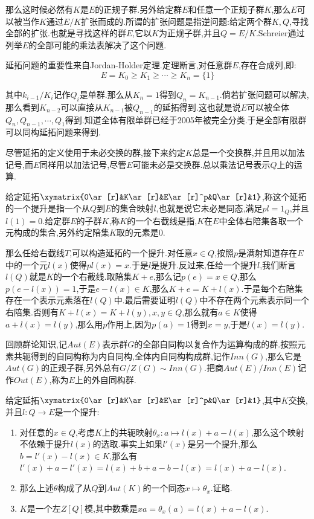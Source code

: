 那么这时候必然有$K$是$E$的正规子群.另外给定群$E$和任意一个正规子群$K$,那么$E$可以被当作$K$通过$E/K$扩张而成的.所谓的扩张问题是指逆问题:给定两个群$K,Q$,寻找全部的扩张.也就是寻找这样的群$E$,它以$K$为正规子群,并且$Q=E/K$.Schreier通过列举$E$的全部可能的乘法表解决了这个问题.

延拓问题的重要性来自Jordan-Holder定理.定理断言,对任意群$E$,存在合成列,即:
$$E=K_0\ge K_1\ge\cdots\ge K_n=\{1\}$$

其中$k_{i-1}/K_i$记作$Q_i$是单群.那么从$K_n=1$得到$Q_{n}=K_{n-1}$.倘若扩张问题可以解决,那么看到$K_{n-2}$可以直接从$K_{n-1}$被$Q_{n-1}$的延拓得到.这也就是说$E$可以被全体$Q_n,Q_{n-1},\cdots,Q_1$得到.知道全体有限单群已经于2005年被完全分类.于是全部有限群可以同构延拓问题来得到.

尽管延拓的定义使用于未必交换的群,接下来约定$K$总是一个交换群,并且用以加法记号,而$E$同样用以加法记号,尽管$E$可能未必是交换群.总以乘法记号表示$Q$上的运算.

给定延拓$\xymatrix{0\ar[r]&K\ar[r]&E\ar[r]^p&Q\ar[r]&1}$,称这个延拓的一个提升是指一个从$Q$到$E$的集合映射$l$,也就是说它未必是同态,满足$pl=1_Q$,并且$l(1)=0$.给定群$E$的子群$K$,称$K$的一个右截线是指,$K$在$E$中全体右陪集各取一个元构成的集合,另外约定陪集$K$取的元素是0.

那么任给右截线$T$,可以构造延拓的一个提升.对任意$x\in Q$,按照$p$是满射知道存在$E$中的一个元$l(x)$使得$pl(x)=x$.于是$l$是提升.反过来,任给一个提升$l$,我们断言$l(Q)$就是$K$的一个右截线.取陪集$K+e$,那么记$p(e)=x\in Q$,那么$p(e-l(x))=1$,于是$e-l(x)\in K$,那么$K+e=K+l(x)$.于是每个右陪集存在一个表示元素落在$l(Q)$中.最后需要证明$l(Q)$中不存在两个元素表示同一个右陪集.否则有$K+l(x)=K+l(y),x,y\in Q$,那么就有$a\in K$使得$a+l(x)=l(y)$,那么用$p$作用上,因为$p(a)=1$得到$x=y$,于是$l(x)=l(y)$.

回顾群论知识,记$Aut(E)$表示群$G$的全部自同构以复合作为运算构成的群.按照元素共轭得到的自同构称为内自同构,全体内自同构构成群,记作$Inn(G)$,那么它是$Aut(G)$的正规子群,另外总有$G/Z(G)\sim Inn(G)$.把商$Aut(E)/Inn(E)$记作$Out(E)$,称为$E$上的外自同构群.

给定延拓$\xymatrix{0\ar[r]&K\ar[r]&E\ar[r]^p&Q\ar[r]&1}$,其中$K$交换,并且$l:Q\to E$是一个提升:
\begin{enumerate}
	\item 对任意的$x\in Q$,考虑$K$上的共轭映射$\theta_x:a\mapsto l(x)+a-l(x)$,那么这个映射不依赖于提升$l(x)$的选取.事实上如果$l'(x)$是另一个提升,那么$b=l'(x)-l(x)\in K$,那么有$l'(x)+a-l'(x)=l(x)+b+a-b-l(x)=l(x)+a-l(x)$.
	\item 那么上述$\theta$构成了从$Q$到$Aut(K)$的一个同态$x\mapsto\theta_x$.证略.
	\item $K$是一个左$Z[Q]$模,其中数乘是$xa=\theta_x(a)=l(x)+a-l(x)$.
\end{enumerate}

